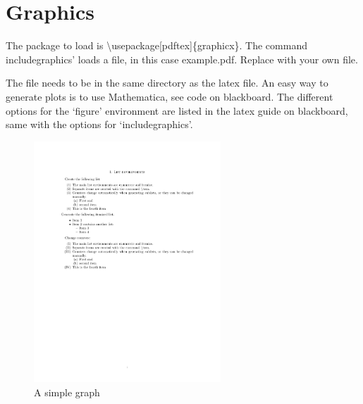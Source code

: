\documentclass[11pt,reqno]{amsart}
\theoremstyle{plain}
\theoremstyle{definition}
\begin{document}
\section{Graphics}


 The package to load is \textbackslash{}usepackage[pdftex]\{graphicx\}. The command includegraphics' loads a file, in this case example.pdf. Replace with your own file.
 
 The file needs to be in the same directory as the latex file.
  An easy way to generate plots is to use Mathematica, see code on blackboard.
The different options for the `figure' environment are listed in the latex guide
 on blackboard, same with the options for `includegraphics'.

\begin{figure}[h]
\begin{center}
\includegraphics[width=7cm]{script4math}
\caption{A simple graph}
\end{center}
\end{figure}
\end{document}
